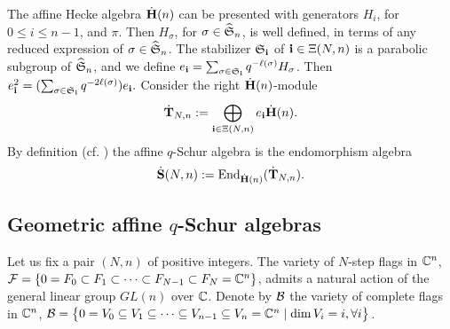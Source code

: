 The affine Hecke algebra $\dot{\bf H}(n)$ can be presented with generators $H_i$, for $0\le i \le n-1$, and $\pi$. Then $H_\sigma$, for $\sigma \in \widehat{\mathfrak S}_n$, is well defined, in terms of any reduced expression of $\sigma \in \widehat{\mathfrak S}_n$. The stabilizer $\mathfrak S_{\mathbf{i}}$ of $\mathbf{i} \in \Xi(N,n)$ is a parabolic subgroup of $\widehat{\mathfrak S}_n$, and we define %
$e_{\mathbf{i}} =\sum_{\sigma \in \mathfrak S_{\mathbf{i}}} q^{-\ell(\sigma)} H_\sigma$. Then $e_{\mathbf{i}}^2 =(\sum_{\sigma\in \mathfrak S_{\mathbf{i}}} q^{-2\ell(\sigma)}) e_{\mathbf{i}}.$
Consider the right $\dot{\bf H}(n)$-module 
\begin{align} \label{T:module}
    \dot{\mathbf{T}}_{N,n} := \bigoplus_{\mathbf{i} \in \Xi(N,n)} e_{\mathbf{i}} \dot{\bf H}(n).
\end{align}
By definition (cf. \cite{Gre99}) the affine $q$-Schur algebra is the endomorphism algebra
\begin{align} \label{def:affineSchur}
    \dot{\bf S}(N,n) :={\rm End}_{\dot{\bf H}(n)} (\dot{\mathbf{T}}_{N,n}).
\end{align}

\subsection{Geometric affine $q$-Schur algebras}

Let us fix a pair $(N, n)$ of positive integers. 
The variety of $N$-step flags in $\mathbb{C}^n$, $\mathcal{F} =\{0=F_0\subset F_1\subset \cdots \subset F_{N-1} \subset F_N=\mathbb{C}^n\}$, admits a natural action of the general linear group $GL(n)$ over $\mathbb{C}$.
Denote by $\mathcal{B}$ the variety of complete flags in $\mathbb{C}^n$, $\mathcal{B}=\big\{0=V_0\subseteq V_1 \subseteq \cdots \subseteq   V_{n-1} \subseteq V_n= \mathbb{C}^n\mid \dim V_i=i, \forall i\big\}$.

